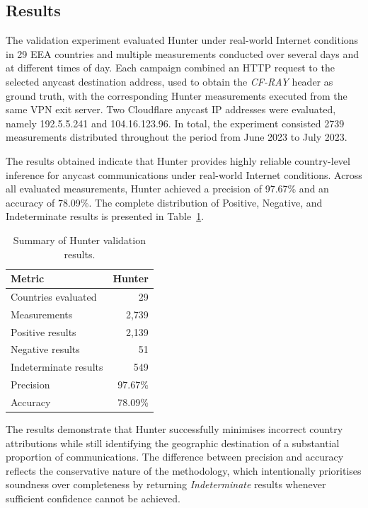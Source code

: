 \subsection{Results}

The validation experiment evaluated Hunter under real-world Internet conditions in 29 EEA countries and multiple measurements conducted over several days and at different times of day. Each campaign combined an HTTP request to the selected anycast destination address, used to obtain the \textit{CF-RAY} header as ground truth, with the corresponding Hunter measurements executed from the same VPN exit server. Two Cloudflare anycast IP addresses were evaluated, namely 192.5.5.241 and 104.16.123.96. In total, the experiment consisted 2739 measurements distributed throughout the period from June 2023 to July 2023.

The results obtained indicate that Hunter provides highly reliable country-level inference for anycast communications under real-world Internet conditions. Across all evaluated measurements, Hunter achieved a precision of 97.67\% and an accuracy of 78.09\%. The complete distribution of Positive, Negative, and Indeterminate results is presented in Table~\ref{tab:hunter_validation_results}.

\begin{table}[ht]
    \centering
    \small
    \caption{Summary of Hunter validation results.}
    \label{tab:hunter_validation_results}
    \begin{tabular}{lr}
        \toprule
        \textbf{Metric} & \textbf{Hunter} \\
        \midrule
        Countries evaluated & 29 \\
        Measurements & 2,739 \\
        Positive results & 2,139 \\
        Negative results & 51 \\
        Indeterminate results & 549 \\
        Precision & 97.67\% \\
        Accuracy & 78.09\% \\
        \bottomrule
    \end{tabular}
\end{table}


The results demonstrate that Hunter successfully minimises incorrect country attributions while still identifying the geographic destination of a substantial proportion of communications. The difference between precision and accuracy reflects the conservative nature of the methodology, which intentionally prioritises soundness over completeness by returning \textit{Indeterminate} results whenever sufficient confidence cannot be achieved.

